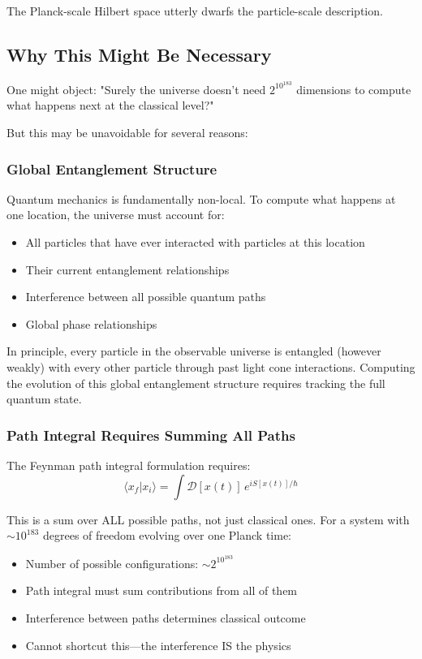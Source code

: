 ﻿\documentclass{article}
\begin{document}
The Planck-scale Hilbert space utterly dwarfs the particle-scale description.


\subsection{Why This Might Be Necessary}


One might object: "Surely the universe doesn't need $2^{10^{183}}$ dimensions to compute what happens next at the classical level?"


But this may be unavoidable for several reasons:


\subsubsection{Global Entanglement Structure}


Quantum mechanics is fundamentally non-local. To compute what happens at one location, the universe must account for:
\begin{itemize}
\item All particles that have ever interacted with particles at this location
\item Their current entanglement relationships
\item Interference between all possible quantum paths
\item Global phase relationships
\end{itemize}


In principle, every particle in the observable universe is entangled (however weakly) with every other particle through past light cone interactions. Computing the evolution of this global entanglement structure requires tracking the full quantum state.


\subsubsection{Path Integral Requires Summing All Paths}


The Feynman path integral formulation requires:
\begin{equation}
\langle x_f | x_i \rangle = \int \mathcal{D}[x(t)] \, e^{iS[x(t)]/\hbar}
\end{equation}


This is a sum over ALL possible paths, not just classical ones. For a system with $\sim 10^{183}$ degrees of freedom evolving over one Planck time:
\begin{itemize}
\item Number of possible configurations: $\sim 2^{10^{183}}$
\item Path integral must sum contributions from all of them
\item Interference between paths determines classical outcome
\item Cannot shortcut this—the interference IS the physics
\end{itemize}
\end{document}

